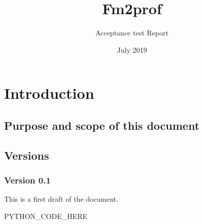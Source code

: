 \documentclass[signature]{deltares_report}
\begin{document}
\pagestyle{empty}
\cleardoublepage
%

\newcommand{\ProgramName}{Fm2prof\xspace}

\title{\ProgramName}
\subtitle{Acceptance test Report}
\classification{-}

\date{July 2019}



\summary{}

\datei{\today}
\revieweri{}
\approvali{}

\disclaimer{}

\deltarestitle

\chapter{Introduction} 
\label{chapterIntroduction}

\section{Purpose and scope of this document} \label{sec:PurposeAndScope}

\section{Versions}
\label{sec:Versions}

\subsection{Version 0.1}
\label{sec:Version}
This is a first draft of the document.


PYTHON_CODE_HERE

\pagestyle{empty}
\mbox{}

\end{document}
